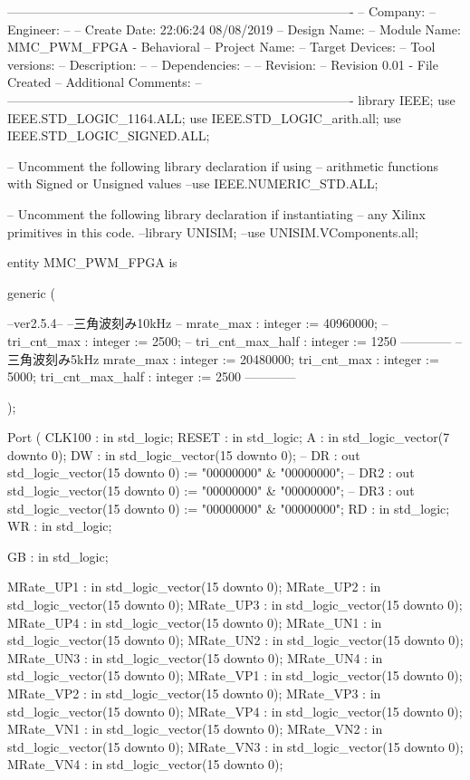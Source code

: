 \begin{mylisting}[language=VHDL,caption=ゲート信号出力モジュール,label=MMC_PWM_GEN_module_VHDL]


----------------------------------------------------------------------------------
-- Company: 
-- Engineer: 
-- 
-- Create Date:    22:06:24 08/08/2019 
-- Design Name: 
-- Module Name:    MMC_PWM_FPGA - Behavioral 
-- Project Name: 
-- Target Devices: 
-- Tool versions: 
-- Description: 
--
-- Dependencies: 
--
-- Revision: 
-- Revision 0.01 - File Created
-- Additional Comments: 
--
----------------------------------------------------------------------------------
library IEEE;
use IEEE.STD_LOGIC_1164.ALL;
use IEEE.STD_LOGIC_arith.all;
use IEEE.STD_LOGIC_SIGNED.ALL;

-- Uncomment the following library declaration if using
-- arithmetic functions with Signed or Unsigned values
--use IEEE.NUMERIC_STD.ALL;

-- Uncomment the following library declaration if instantiating
-- any Xilinx primitives in this code.
--library UNISIM;
--use UNISIM.VComponents.all;

entity MMC_PWM_FPGA is

	generic (

--ver2.5.4--
		--三角波刻み10kHz
--		mrate_max				: integer := 40960000;	
	--	tri_cnt_max				: integer := 2500;		
	--	tri_cnt_max_half		: integer := 1250
------------				--三角波刻み5kHz
		mrate_max				: integer := 20480000;	
		tri_cnt_max				: integer := 5000;		
		tri_cnt_max_half		: integer := 2500
------------		


	);
	
	Port (
		CLK100		: in	std_logic;
		RESET		: in	std_logic;
		A			: in	std_logic_vector(7 downto 0);
		DW			: in	std_logic_vector(15 downto 0);
--		DR			: out	std_logic_vector(15 downto 0)	:= "00000000" & "00000000";
--		DR2		: out	std_logic_vector(15 downto 0)	:= "00000000" & "00000000";
--		DR3		: out	std_logic_vector(15 downto 0)	:= "00000000" & "00000000";
		RD			: in	std_logic;
		WR			: in	std_logic;
		
		GB			: in  std_logic;
		
		MRate_UP1 : in std_logic_vector(15 downto 0);
		MRate_UP2 : in std_logic_vector(15 downto 0);
		MRate_UP3 : in std_logic_vector(15 downto 0);
		MRate_UP4 : in std_logic_vector(15 downto 0);
		MRate_UN1 : in std_logic_vector(15 downto 0);
		MRate_UN2 : in std_logic_vector(15 downto 0);
		MRate_UN3 : in std_logic_vector(15 downto 0);
		MRate_UN4 : in std_logic_vector(15 downto 0);
		MRate_VP1 : in std_logic_vector(15 downto 0);
		MRate_VP2 : in std_logic_vector(15 downto 0);
		MRate_VP3 : in std_logic_vector(15 downto 0);
		MRate_VP4 : in std_logic_vector(15 downto 0);
		MRate_VN1 : in std_logic_vector(15 downto 0);
		MRate_VN2 : in std_logic_vector(15 downto 0);
		MRate_VN3 : in std_logic_vector(15 downto 0);
		MRate_VN4 : in std_logic_vector(15 downto 0);
		

\end{mylisting}
